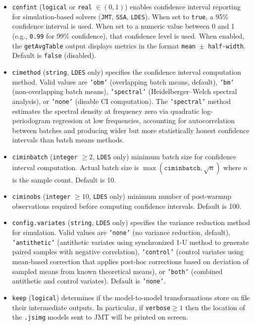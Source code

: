 \begin{itemize}
\item \texttt{confint} (\texttt{logical} or \texttt{real} $\in (0,1)$) enables confidence interval reporting for simulation-based solvers (\texttt{JMT}, \texttt{SSA}, \texttt{LDES}). When set to \texttt{true}, a 95\% confidence interval is used. When set to a numeric value between 0 and 1 (e.g., \texttt{0.99} for 99\% confidence), that confidence level is used. When enabled, the \texttt{getAvgTable} output displays metrics in the format \texttt{mean $\pm$ half-width}. Default is \texttt{false} (disabled).

\item \texttt{cimethod} (\texttt{string}, \texttt{LDES} only) specifies the confidence interval computation method. Valid values are \texttt{'obm'} (overlapping batch means, default), \texttt{'bm'} (non-overlapping batch means), \texttt{'spectral'} (Heidelberger--Welch spectral analysis), or \texttt{'none'} (disable CI computation). The \texttt{'spectral'} method estimates the spectral density at frequency zero via quadratic log-periodogram regression at low frequencies, accounting for autocorrelation between batches and producing wider but more statistically honest confidence intervals than batch means methods.

\item \texttt{ciminbatch} (\texttt{integer} $\geq 2$, \texttt{LDES} only) minimum batch size for confidence interval computation. Actual batch size is $\max(\mathtt{ciminbatch}, \sqrt{n})$ where $n$ is the sample count. Default is 10.

\item \texttt{ciminobs} (\texttt{integer} $\geq 10$, \texttt{LDES} only) minimum number of post-warmup observations required before computing confidence intervals. Default is 100.

\item \texttt{config.variates} (\texttt{string}, \texttt{LDES} only) specifies the variance reduction method for simulation. Valid values are \texttt{'none'} (no variance reduction, default), \texttt{'antithetic'} (antithetic variates using synchronized 1-U method to generate paired samples with negative correlation), \texttt{'control'} (control variates using mean-based correction that applies post-hoc corrections based on deviation of sampled means from known theoretical means), or \texttt{'both'} (combined antithetic and control variates). Default is \texttt{'none'}.

\item \texttt{keep} (\texttt{logical}) determines if the model-to-model transformations store on file their intermediate outputs. In particular, if \texttt{verbose}$\geq 1$ then the location of the \texttt{.jsimg} models sent to JMT will be printed on screen.


\end{itemize}
